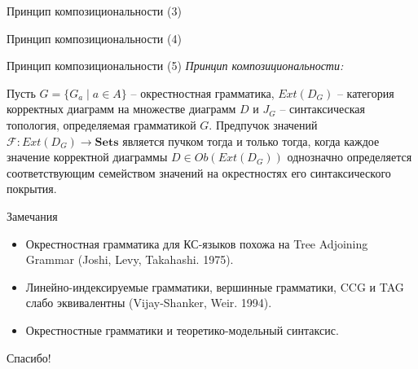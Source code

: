 \documentclass{beamer}
\begin{document}
\begin{frame}{Принцип композициональности (3)}
\end{frame}

\begin{frame}{Принцип композициональности (4)}
\end{frame}

\begin{frame}{Принцип композициональности (5)}
\textit{Принцип композициональности:}\\
\medskip
\begin{block}{}
\justifying
\begin{small}
Пусть $G = \{ G_a \; \vert \; a \in A \}$ -- окрестностная грамматика, $Ext(D_G)$ -- категория корректных диаграмм на множестве диаграмм $D$ и $J_G$ -- синтаксическая топология, определяемая грамматикой $G$. Предпучок значений $\mathcal{F} : Ext(D_G) \to \textbf{Sets}$ является пучком тогда и только тогда, когда каждое значение корректной диаграммы $D \in Ob(Ext(D_G))$ однозначно определяется соответствующим семейством значений на окрестностях его синтаксического покрытия.
\end{small}
\end{block}

\end{frame}

\begin{frame}{Замечания}
\medskip
\begin{small}
\begin{itemize}
	\item Окрестностная грамматика для КС-языков похожа на Tree Adjoining Grammar (Joshi, Levy, Takahashi. 1975).
	\item Линейно-индексируемые грамматики, вершинные грамматики, CCG и TAG слабо эквивалентны (Vijay-Shanker, Weir. 1994).
	\item Окрестностные грамматики и теоретико-модельный синтаксис.
\end{itemize}
\end{small}
\end{frame}



\begin{frame}{}
    \thispagestyle{empty}
    \begin{center}
        {\large Спасибо!}
    \end{center}
\end{frame}


\end{document}
